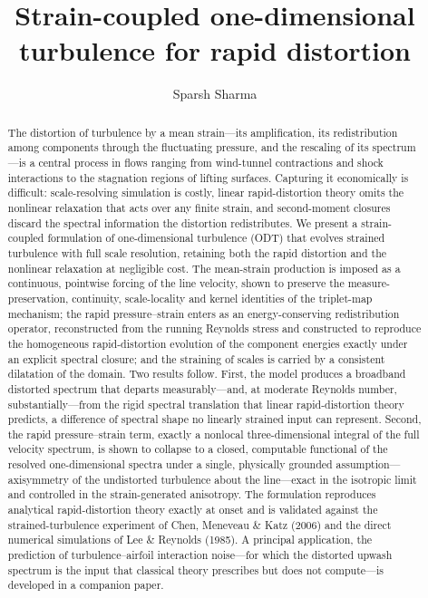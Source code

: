 \documentclass[lineno]{JFM-FLM_Au}
\title{Strain-coupled one-dimensional turbulence for rapid distortion}
\author{Sparsh Sharma\aff{1}}
\affiliation{\aff{1}German Aerospace Center (DLR), 38108 Braunschweig, Germany}
\newcounter{assumption}
\begin{document}
\maketitle


\begin{abstract}
The distortion of turbulence by a mean strain---its amplification, its
redistribution among components through the fluctuating pressure, and the
rescaling of its spectrum---is a central process in flows ranging from
wind-tunnel contractions and shock interactions to the stagnation regions of
lifting surfaces. Capturing it economically is difficult: scale-resolving
simulation is costly, linear rapid-distortion theory omits the nonlinear
relaxation that acts over any finite strain, and second-moment closures discard
the spectral information the distortion redistributes. We present a
strain-coupled formulation of one-dimensional turbulence (ODT) that evolves
strained turbulence with full scale resolution, retaining both the rapid
distortion and the nonlinear relaxation at negligible cost. The mean-strain
production is imposed as a continuous, pointwise forcing of the line velocity,
shown to preserve the measure-preservation, continuity, scale-locality and
kernel identities of the triplet-map mechanism; the rapid pressure--strain
enters as an energy-conserving redistribution operator, reconstructed from the
running Reynolds stress and constructed to reproduce the homogeneous
rapid-distortion evolution of the component energies exactly under an explicit
spectral closure; and the straining of scales is carried by a consistent
dilatation of the domain. Two results follow. First, the model produces a
broadband distorted spectrum that departs measurably---and, at moderate
Reynolds number, substantially---from the rigid spectral translation that linear
rapid-distortion theory predicts, a difference of spectral shape no linearly
strained input can represent. Second, the rapid pressure--strain term, exactly
a nonlocal three-dimensional integral of the full velocity spectrum, is shown to
collapse to a closed, computable functional of the resolved one-dimensional
spectra under a single, physically grounded assumption---axisymmetry of the
undistorted turbulence about the line---exact in the isotropic limit and
controlled in the strain-generated anisotropy. The formulation reproduces
analytical rapid-distortion theory exactly at onset and is validated against the
strained-turbulence experiment of Chen, Meneveau \& Katz (2006) and the direct
numerical simulations of Lee \& Reynolds (1985). A principal application, the
prediction of turbulence--airfoil interaction noise---for which the distorted
upwash spectrum is the input that classical theory prescribes but does not
compute---is developed in a companion paper.
\end{abstract}
\end{document}
